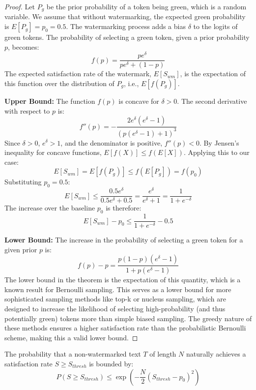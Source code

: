\begin{proof}
Let $P_g$ be the prior probability of a token being green, which is a random variable. We assume that without watermarking, the expected green probability is $E[P_g] = p_0 = 0.5$. The watermarking process adds a bias $\delta$ to the logits of green tokens. The probability of selecting a green token, given a prior probability $p$, becomes:
$$f(p) = \frac{p e^\delta}{p e^\delta + (1-p)}$$
The expected satisfaction rate of the watermark, $E[S_{wm}]$, is the expectation of this function over the distribution of $P_g$, i.e., $E[f(P_g)]$.

\textbf{Upper Bound:}
The function $f(p)$ is concave for $\delta > 0$. The second derivative with respect to $p$ is:
$$f''(p) = -\frac{2e^\delta(e^\delta-1)}{(p(e^\delta-1)+1)^3}$$
Since $\delta > 0$, $e^\delta > 1$, and the denominator is positive, $f''(p) < 0$.
By Jensen's inequality for concave functions, $E[f(X)] \le f(E[X])$. Applying this to our case:
$$E[S_{wm}] = E[f(P_g)] \le f(E[P_g]) = f(p_0)$$
Substituting $p_0=0.5$:
$$E[S_{wm}] \le \frac{0.5 e^\delta}{0.5 e^\delta + 0.5} = \frac{e^\delta}{e^\delta+1} = \frac{1}{1+e^{-\delta}}$$
The increase over the baseline $p_0$ is therefore:
$$E[S_{wm}] - p_0 \le \frac{1}{1+e^{-\delta}} - 0.5$$

\textbf{Lower Bound:}
The increase in the probability of selecting a green token for a given prior $p$ is:
$$f(p) - p = \frac{p(1-p)(e^\delta-1)}{1+p(e^\delta-1)}$$
The lower bound in the theorem is the expectation of this quantity, which is a known result for Bernoulli sampling. This serves as a lower bound for more sophisticated sampling methods like top-k or nucleus sampling, which are designed to increase the likelihood of selecting high-probability (and thus potentially green) tokens more than simple biased sampling. The greedy nature of these methods ensures a higher satisfaction rate than the probabilistic Bernoulli scheme, making this a valid lower bound.
\end{proof}

\begin{theorem}
The probability that a non-watermarked text $T$ of length $N$ naturally achieves a satisfaction rate $S \ge S_{thresh}$ is bounded by:
$$P(S \ge S_{thresh}) \le \exp\left( -\frac{N}{2} (S_{thresh} - p_0)^2 \right)$$
\end{theorem}

